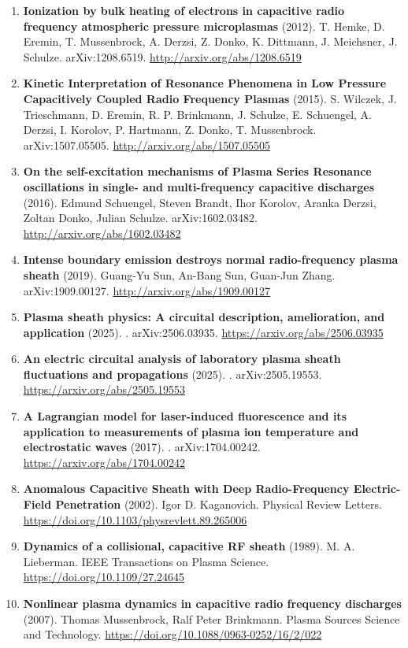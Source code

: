 \documentclass[11pt,a4paper]{article}
\begin{document}
\begin{enumerate}[leftmargin=1.4em]
\item \textbf{Ionization by bulk heating of electrons in capacitive radio frequency atmospheric pressure microplasmas} (2012). T. Hemke, D. Eremin, T. Mussenbrock, A. Derzsi, Z. Donko, K. Dittmann, J. Meichsner, J. Schulze. arXiv:1208.6519. \url{http://arxiv.org/abs/1208.6519}
\item \textbf{Kinetic Interpretation of Resonance Phenomena in Low Pressure Capacitively Coupled Radio Frequency Plasmas} (2015). S. Wilczek, J. Trieschmann, D. Eremin, R. P. Brinkmann, J. Schulze, E. Schuengel, A. Derzsi, I. Korolov, P. Hartmann, Z. Donko, T. Mussenbrock. arXiv:1507.05505. \url{http://arxiv.org/abs/1507.05505}
\item \textbf{On the self-excitation mechanisms of Plasma Series Resonance oscillations in single- and multi-frequency capacitive discharges} (2016). Edmund Schuengel, Steven Brandt, Ihor Korolov, Aranka Derzsi, Zoltan Donko, Julian Schulze. arXiv:1602.03482. \url{http://arxiv.org/abs/1602.03482}
\item \textbf{Intense boundary emission destroys normal radio-frequency plasma sheath} (2019). Guang-Yu Sun, An-Bang Sun, Guan-Jun Zhang. arXiv:1909.00127. \url{http://arxiv.org/abs/1909.00127}
\item \textbf{Plasma sheath physics: A circuital description, amelioration, and application} (2025). . arXiv:2506.03935. \url{https://arxiv.org/abs/2506.03935}
\item \textbf{An electric circuital analysis of laboratory plasma sheath fluctuations and propagations} (2025). . arXiv:2505.19553. \url{https://arxiv.org/abs/2505.19553}
\item \textbf{A Lagrangian model for laser-induced fluorescence and its application to measurements of plasma ion temperature and electrostatic waves} (2017). . arXiv:1704.00242. \url{https://arxiv.org/abs/1704.00242}
\item \textbf{Anomalous Capacitive Sheath with Deep Radio-Frequency Electric-Field Penetration} (2002). Igor D. Kaganovich. Physical Review Letters. \url{https://doi.org/10.1103/physrevlett.89.265006}
\item \textbf{Dynamics of a collisional, capacitive RF sheath} (1989). M. A. Lieberman. IEEE Transactions on Plasma Science. \url{https://doi.org/10.1109/27.24645}
\item \textbf{Nonlinear plasma dynamics in capacitive radio frequency discharges} (2007). Thomas Mussenbrock, Ralf Peter Brinkmann. Plasma Sources Science and Technology. \url{https://doi.org/10.1088/0963-0252/16/2/022}

\end{enumerate}
\end{document}
